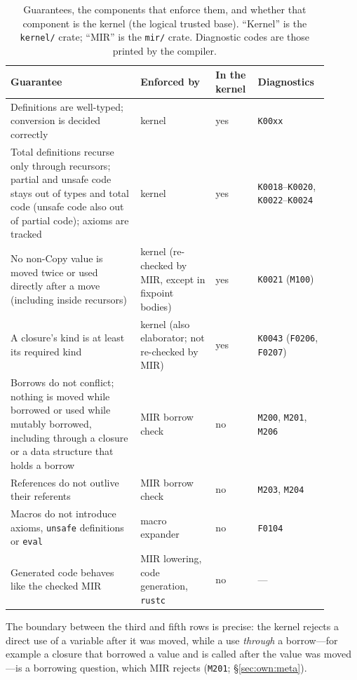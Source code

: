 \begin{table}[t]
\centering\footnotesize
\caption{Guarantees, the components that enforce them, and whether that component is the kernel (the logical trusted base). ``Kernel'' is the \texttt{kernel/} crate; ``MIR'' is the \texttt{mir/} crate. Diagnostic codes are those printed by the compiler.}
\label{tab:trust}
\begin{tabular}{p{0.38\linewidth}p{0.22\linewidth}p{0.1\linewidth}p{0.2\linewidth}}\hline
\textbf{Guarantee} & \textbf{Enforced by} & \textbf{In the kernel} & \textbf{Diagnostics}\\\hline\hline
Definitions are well-typed; conversion is decided correctly & kernel & yes & \texttt{K00xx}\\
Total definitions recurse only through recursors; partial and unsafe code stays out of types and total code (unsafe code also out of partial code); axioms are tracked & kernel & yes & \texttt{K0018}--\texttt{K0020}, \texttt{K0022}--\texttt{K0024}\\
No non-Copy value is moved twice or used directly after a move (including inside recursors) & kernel (re-checked by MIR, except in fixpoint bodies) & yes & \texttt{K0021} (\texttt{M100})\\
A closure's kind is at least its required kind & kernel (also elaborator; not re-checked by MIR) & yes & \texttt{K0043} (\texttt{F0206}, \texttt{F0207})\\
Borrows do not conflict; nothing is moved while borrowed or used while mutably borrowed, including through a closure or a data structure that holds a borrow & MIR borrow check & no & \texttt{M200}, \texttt{M201}, \texttt{M206}\\
References do not outlive their referents & MIR borrow check & no & \texttt{M203}, \texttt{M204}\\
Macros do not introduce axioms, \lstinline|unsafe| definitions or \lstinline|eval| & macro expander & no & \texttt{F0104}\\
Generated code behaves like the checked MIR & MIR lowering, code generation, \texttt{rustc} & no & ---\\\hline
\end{tabular}
\end{table}

The boundary between the third and fifth rows is precise: the kernel rejects a direct use of a variable after it was moved, while a use \emph{through} a borrow---for example a closure that borrowed a value and is called after the value was moved---is a borrowing question, which MIR rejects (\texttt{M201}; \S\ref{sec:own:meta}).

